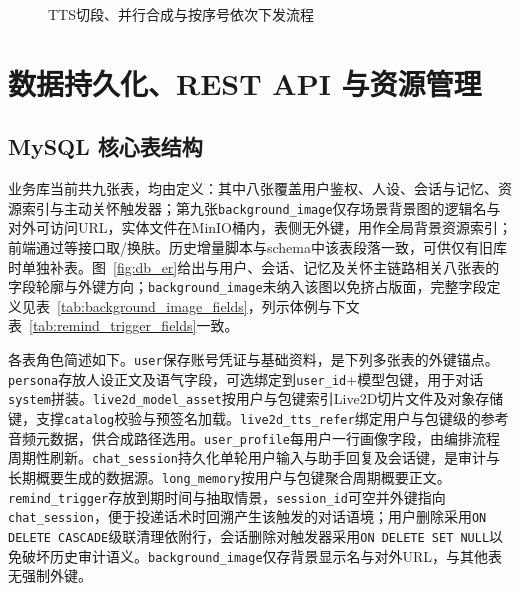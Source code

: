 \documentclass{base}
\begin{document}
\begin{figure}[htbp]
{
    }
    \caption{TTS切段、并行合成与按序号依次下发流程}
    \label{fig:tts_pipeline}
\end{figure}

\section{数据持久化、REST API 与资源管理}

\subsection{MySQL 核心表结构}

业务库当前共九张表，均由定义：其中八张覆盖用户鉴权、人设、会话与记忆、资源索引与主动关怀触发器；第九张\texttt{background\_image}仅存场景背景图的逻辑名与对外可访问URL，实体文件在MinIO桶内，表侧无外键，用作全局背景资源索引；前端通过等接口取/换肤。历史增量脚本与schema中该表段落一致，可供仅有旧库时单独补表。图~\ref{fig:db_er}给出与用户、会话、记忆及关怀主链路相关八张表的字段轮廓与外键方向；\texttt{background\_image}未纳入该图以免挤占版面，完整字段定义见表~\ref{tab:background_image_fields}，列示体例与下文表~\ref{tab:remind_trigger_fields}一致。

各表角色简述如下。\texttt{user}保存账号凭证与基础资料，是下列多张表的外键锚点。\texttt{persona}存放人设正文及语气字段，可选绑定到\texttt{user\_id}+模型包键，用于对话\texttt{system}拼装。\texttt{live2d\_model\_asset}按用户与包键索引Live2D切片文件及对象存储键，支撑\texttt{catalog}校验与预签名加载。\texttt{live2d\_tts\_refer}绑定用户与包键级的参考音频元数据，供合成路径选用。\texttt{user\_profile}每用户一行画像字段，由编排流程周期性刷新。\texttt{chat\_session}持久化单轮用户输入与助手回复及会话键，是审计与长期概要生成的数据源。\texttt{long\_memory}按用户与包键聚合周期概要正文。\texttt{remind\_trigger}存放到期时间与抽取情景，\texttt{session\_id}可空并外键指向\texttt{chat\_session}，便于投递话术时回溯产生该触发的对话语境；用户删除采用\texttt{ON DELETE CASCADE}级联清理依附行，会话删除对触发器采用\texttt{ON DELETE SET NULL}以免破坏历史审计语义。\texttt{background\_image}仅存背景显示名与对外URL，与其他表无强制外键。
\end{document}
